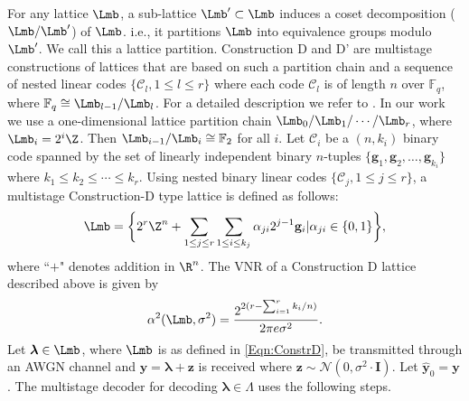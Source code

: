 \documentclass[conference]{IEEEtran}
\begin{document}
For any lattice $\Lmb$, a sub-lattice $\Lmb^\prime\subset \Lmb$ induces a coset decomposition ($\Lmb/\Lmb^\prime$)
of $\Lmb$. i.e., it partitions $\Lmb$ into equivalence groups modulo $\Lmb^\prime$. We call this a lattice partition.
Construction D and D' are multistage constructions of lattices that are based on such a partition chain and a sequence of nested
linear codes $\{\mathcal{C}_{l},1\leq l\leq r\}$ where each code $\mathcal{C}_{l}$ is of length $n$ over $\mathbb{F}_q$, where $\mathbb{F}_q \cong \Lmb_{l-1}/\Lmb_{l}$.
For a detailed description we refer to \cite{conway1999sphere}. In our work we use a one-dimensional lattice partition chain
 $\Lmb_{0}/\Lmb_{1}/\cdots /\Lmb_{r}$, where $\Lmb_{i}=2^{i}\Z$. Then
$\Lmb_{i-1}/\Lmb_{i}\cong \mathbb{F}_{2}$ for all $i$. Let $\mathcal{C}_{i}$ be a $(n,k_i)$ binary code spanned by the
set of linearly independent binary $n$-tuples $\{\mathbf{g}_1,\mathbf{g}_2,\ldots,\mathbf{g}_{k_i}\}$ where $k_{1}\leq k_{2}\leq \cdots \leq k_{r}$. Using nested binary linear codes
$\{\mathcal{C}_{j},1\leq j\leq r\}$, a multistage Construction-D type lattice is defined as follows:
\begin{align}\label{Eqn:ConstrD}
 \Lmb=\biggl\{2^{r}\Z^{n}+\sum_{1\leq j\leq r}\sum_{1\leq i\leq k_{j}}\alpha_{ji}2^{j-1}\mathbf{g}_i|\alpha_{ji}\in\{0,1\}\biggr\},
\end{align}
where ``$+$" denotes addition in $\R^{n}$. The VNR of a Construction D lattice described above is given by
\begin{equation}
    \alpha^{2}(\Lmb,\sigma^{2})=\frac{2^{2(r-\sum_{i=1}^{r}k_{i}/n)}}{2\pi e\sigma^{2}}.
\end{equation}
Let $\boldsymbol\lambda\in\Lmb$, where $\Lmb$ is as defined in \eqref{Eqn:ConstrD}, be transmitted through an AWGN channel and
$\mathbf{y}=\boldsymbol\lambda+\mathbf{z}$ is received where $\mathbf{z}\sim\mathcal{N}(0,\sigma^{2}\cdot \mathbf{I})$. Let $\hat{\mathbf{y}}_{0}=\mathbf{y}$. The multistage decoder for decoding $\boldsymbol\lambda\in \Lambda$ uses the following steps.
\end{document}
